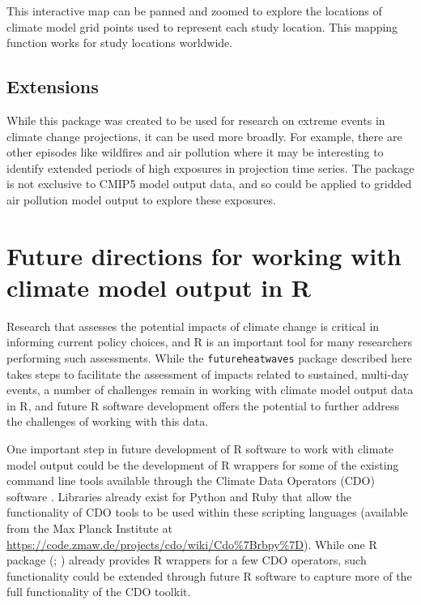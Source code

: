 \noindent This interactive map can be panned and zoomed to explore the
locations of climate model grid points used to represent each study
location. This mapping function works for study locations worldwide.

\subsection{Extensions}\label{extensions}

While this package was created to be used for research on extreme events
in climate change projections, it can be used more broadly. For example,
there are other episodes like wildfires and air pollution where it may
be interesting to identify extended periods of high exposures in
projection time series. The  package is not
exclusive to CMIP5 model output data, and so could be applied to gridded
air pollution model output to explore these exposures.

\section{Future directions for working with climate model output in
R}\label{future-directions-for-working-with-climate-model-output-in-r}

Research that assesses the potential impacts of climate change is
critical in informing current policy choices, and R is an important tool
for many researchers performing such assessments. While the
\texttt{futureheatwaves} package described here takes steps to
facilitate the assessment of impacts related to sustained, multi-day
events, a number of challenges remain in working with climate model
output data in R, and future R software development offers the potential
to further address the challenges of working with this data.

One important step in future development of R software to work with
climate model output could be the development of R wrappers for some of
the existing command line tools available through the Climate Data
Operators (CDO) software \citep{schulzweida2006cdo}. Libraries already
exist for Python and Ruby that allow the functionality of CDO tools to
be used within these scripting languages (available from the Max Planck
Institute at
\url{https://code.zmaw.de/projects/cdo/wiki/Cdo%7Brbpy%7D}). While one R
package (; \citet{ncdf.4helpers}) already
provides R wrappers for a few CDO operators, such functionality could be
extended through future R software to capture more of the full
functionality of the CDO toolkit.

